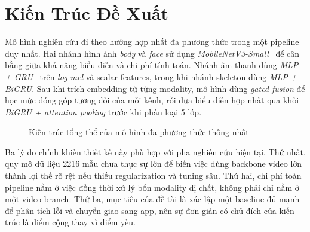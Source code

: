 \documentclass[conference,a4paper]{IEEEtran}
\begin{document}
\section[Kien Truc De Xuat]{Kiến Trúc Đề Xuất}
Mô hình nghiên cứu đi theo hướng hợp nhất đa phương thức trong một pipeline duy nhất. Hai nhánh hình ảnh \textit{body} và \textit{face} sử dụng \textit{MobileNetV3-Small}~\cite{mobilenetv3} để cân bằng giữa khả năng biểu diễn và chi phí tính toán. Nhánh âm thanh dùng \textit{MLP + GRU}~\cite{gru} trên \textit{log-mel} và scalar features, trong khi nhánh skeleton dùng \textit{MLP + BiGRU}. Sau khi trích embedding từ từng modality, mô hình dùng \textit{gated fusion} để học mức đóng góp tương đối của mỗi kênh, rồi đưa biểu diễn hợp nhất qua khối \textit{BiGRU + attention pooling} trước khi phân loại 5 lớp.

\begin{figure}[t]
\caption{Kiến trúc tổng thể của mô hình đa phương thức thống nhất}
\label{fig:model-architecture}
\centering
{}
\end{figure}

Ba lý do chính khiến thiết kế này phù hợp với pha nghiên cứu hiện tại. Thứ nhất, quy mô dữ liệu 2216 mẫu chưa thực sự lớn để biến việc dùng backbone video lớn thành lợi thế rõ rệt nếu thiếu regularization và tuning sâu. Thứ hai, chi phí toàn pipeline nằm ở việc đồng thời xử lý bốn modality dị chất, không phải chỉ nằm ở một video branch. Thứ ba, mục tiêu của đề tài là xác lập một baseline đủ mạnh để phân tích lỗi và chuyển giao sang app, nên sự đơn giản có chủ đích của kiến trúc là điểm cộng thay vì điểm yếu.
\end{document}
